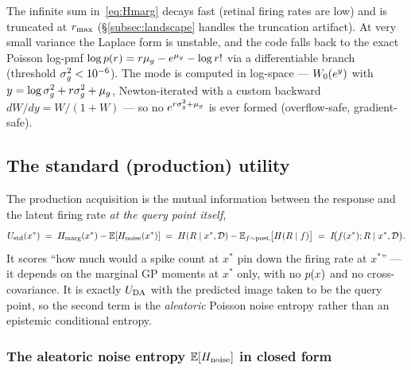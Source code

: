 The infinite sum in~\eqref{eq:Hmarg} decays fast (retinal firing rates are low)
and is truncated at $r_{\max}$ (\S\ref{subsec:landscape} handles the truncation
artifact). At very small variance the Laplace form is unstable, and the code falls
back to the exact Poisson log-pmf $\log p(r)=r\mu_{g}-e^{\mu_{g}}-\log r!$ via a
differentiable branch (threshold $\sigma_{g}^{2}<10^{-6}$). The mode is computed in
log-space --- $W_{0}(e^{y})$ with $y=\log\sigma_{g}^{2}+r\sigma_{g}^{2}+\mu_{g}$, Newton-iterated with a
custom backward $dW/dy=W/(1+W)$ --- so no $e^{r\sigma_{g}^{2}+\mu_{g}}$ is ever formed
(overflow-safe, gradient-safe).

\subsection{The standard (production) utility}
\label{subsec:standard}

The production acquisition is the mutual information between the response and the
latent firing rate \emph{at the query point itself},
%
\begin{equation}
  U_{\mathrm{std}}(x^{*})
  \;=\; H_{\mathrm{marg}}(x^{*}) - \mathbb{E}[H_{\mathrm{noise}}(x^{*})]
  \;=\; H(R\mid x^{*},\mathcal D) - \mathbb{E}_{f\sim\text{post.}}\!\big[H(R\mid f)\big]
  \;=\; I\!\big(f(x^{*});R\mid x^{*},\mathcal D\big).
  \label{eq:Ustd}
\end{equation}
%
It scores ``how much would a spike count at $x^{*}$ pin down the firing rate at
$x^{*}$'' --- it depends on the marginal GP moments at $x^{*}$ only, with no $p(x)$
and no cross-covariance. It is exactly $U_{\mathrm{DA}}$ with the predicted image taken to be
the query point, so the second term is the \emph{aleatoric} Poisson noise entropy
rather than an epistemic conditional entropy.

\subsubsection{The aleatoric noise entropy \texorpdfstring{$\mathbb{E}[H_{\mathrm{noise}}]$}{E[H\_noise]} in closed form}
\label{subsubsec:hnoise}

